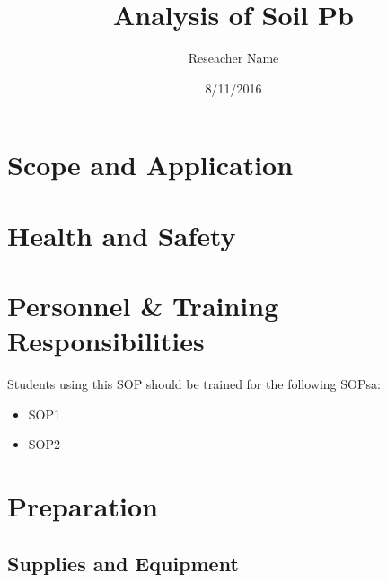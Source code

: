 \documentclass[12pt]{../SOP2}
\title{Analysis of Soil Pb}
\date{8/11/2016}
\author{Reseacher Name}
\begin{document}


\maketitle

\section{Scope and Application}

\NP \blindtext

\NP \lipsum[1]

\tableofcontents

\newpage

\section{Health and Safety}

\NP \lipsum[2]


\section{Personnel \& Training Responsibilities}

\NP \lipsum[1]

Students using this SOP should be trained for the following SOPsa:

\begin{itemize}
  \item SOP1
  \item SOP2
\end{itemize}


\section{Preparation}

\subsection{Supplies and Equipment}
\end{document}
